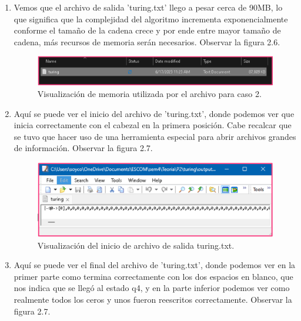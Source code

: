 \begin{enumerate}
\newpage
\item Vemos que el archivo de salida 'turing.txt' llego a pesar cerca de 90MB, lo que significa que la complejidad del algoritmo incrementa exponencialmente conforme el tamaño de la cadena crece y por ende entre mayor tamaño de cadena, más recursos de memoria serán necesarios. Observar la figura 2.6.

\begin{figure}[h]
    \begin{center}
    \includegraphics[width=1\linewidth]{Images/Cap5.png}
    \end{center}
\caption{Visualización de memoria utilizada por el archivo para caso 2.}
\label{fig:imagen}
\end{figure}
\newpage
\item Aquí se puede ver el inicio del archivo de 'turing.txt', donde podemos ver que inicia correctamente con el cabezal en la primera posición. Cabe recalcar que se tuvo que hacer uso de una herramienta especial para abrir archivos grandes de información. Observar la figura 2.7.

\begin{figure}[h]
    \begin{center}
    \includegraphics[width=1\linewidth]{Images/Cap6.png}
    \end{center}
\caption{Visualización del inicio de archivo de salida turing.txt.}
\label{fig:imagen}
\end{figure}
\newpage
\item Aquí se puede ver el final del archivo de 'turing.txt', donde podemos ver en la primer parte como termina correctamente con los dos espacios en blanco, que nos indica que se llegó al estado q4, y en la parte inferior podemos ver como realmente todos los ceros y unos fueron reescritos correctamente. Observar la figura 2.7.


\end{enumerate}
